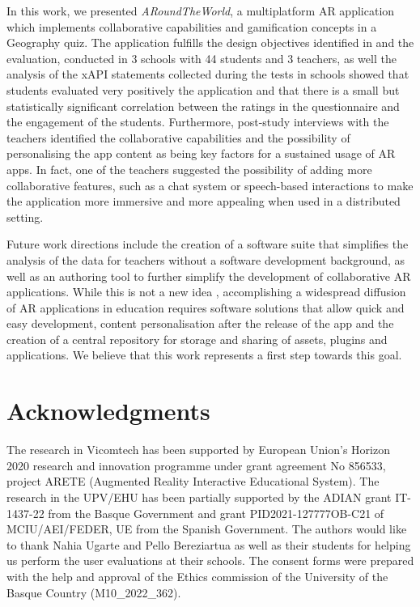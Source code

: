 \documentclass[pdflatex,sn-basic,iicol]{sn-jnl}%
\def\appname/{\textit{ARoundTheWorld}}
\def\numschools/{3}
\def\numstudents/{44}
\begin{document}
In this work, we presented \appname/, a multiplatform AR application which implements collaborative capabilities and gamification concepts in a Geography quiz. The application fulfills the design objectives identified in \citep{Masneri2023} and the evaluation, conducted in \numschools/ schools with \numstudents/ students and 3 teachers, as well the analysis of the xAPI statements collected during the tests in schools showed that students evaluated very positively the application and that there is a small but statistically significant correlation between the ratings in the questionnaire and the engagement of the students. Furthermore, post-study interviews with the teachers identified the collaborative capabilities and the possibility of personalising the app content as being key factors for a sustained usage of AR apps. In fact, one of the teachers suggested the possibility of adding more collaborative features, such as a chat system or speech-based interactions to make the application more immersive and more appealing when used in a distributed setting.

Future work directions include the creation of a software suite that simplifies the analysis of the data for teachers without a software development background, as well as an authoring tool to further simplify the development of collaborative AR applications. While this is not a new idea \citep{rajaram2022paper, thanyadit2022easy}, accomplishing a widespread diffusion of AR applications in education requires software solutions that allow quick and easy development, content personalisation after the release of the app and the creation of a central repository for storage and sharing of assets, plugins and applications. We believe that this work represents a first step towards this goal.


\section*{Acknowledgments}
The research in Vicomtech has been supported by European Union’s Horizon 2020 research and innovation programme under grant agreement No 856533, project ARETE (Augmented Reality Interactive Educational System).
The research in the UPV/EHU has been partially supported by the ADIAN grant IT-1437-22 from the Basque Government and grant PID2021-127777OB-C21 of MCIU/AEI/FEDER, UE from the Spanish Government. The authors would like to thank Nahia Ugarte and Pello Bereziartua as well as their students for helping us perform the user evaluations at their schools. The consent forms were prepared with the help and approval of the Ethics commission of the University of the Basque Country (M10\_2022\_362).
\end{document}
